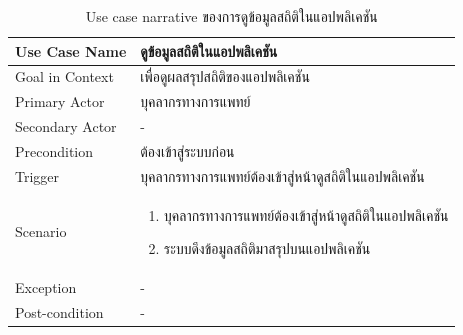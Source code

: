 \documentclass[12pt,oneside,openright,a4paper]{cpe-thai-project}
\begin{document}
\begin{itemize}
\begin{figure}[!ht]
     \end{figure}
     \newpage
     \begin{table}[!h]\centering
      \caption{Use case narrative ของการดูข้อมูลสถิติในแอปพลิเคชัน}\label{tbl:application1}
      \begin{tabular}{|p{4cm}|p{10cm}|} \hline
      Use Case Name & ดูข้อมูลสถิติในแอปพลิเคชัน \\ \hline
      Goal in Context & เพื่อดูผลสรุปสถิติของแอปพลิเคชัน \\ \hline
      Primary Actor & บุคลากรทางการแพทย์ \\ \hline
      Secondary Actor & - \\ \hline
      Precondition & ต้องเข้าสู่ระบบก่อน \\ \hline
      Trigger & บุคลากรทางการแพทย์ต้องเข้าสู่หน้าดูสถิติในแอปพลิเคชัน \\ \hline
      Scenario & \begin{enumerate}
        \item บุคลากรทางการแพทย์ต้องเข้าสู่หน้าดูสถิติในแอปพลิเคชัน
        \item ระบบดึงข้อมูลสถิติมาสรุปบนแอปพลิเคชัน 
      \end{enumerate} \\ \hline
      Exception & - \\ \hline
      Post-condition & - \\ \hline
  

\end{tabular}
\end{table}
\end{itemize}
\end{document}
